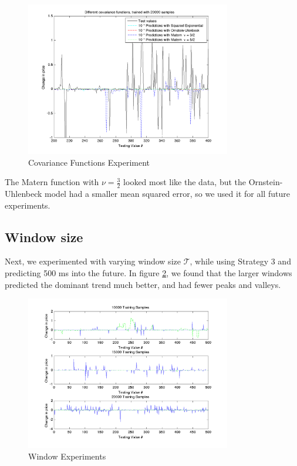 \documentclass{article} %
\begin{document}
\begin{figure}[h]
	\label{fig1}
	\centering
	\includegraphics[width=0.8\textwidth]{../code/fig_1.png}
	\caption{Covariance Functions Experiment}
\end{figure}

The Matern function with $\nu = \frac{3}{2}$ looked most like the data, but the Ornstein-Uhlenbeck model had a smaller mean squared error, so we used it for all future experiments.

\subsection{Window size}
Next, we experimented with varying window size $\mathcal{T}$, while using Strategy 3 and predicting 500 ms into the future.
In figure \ref{fig2}, we found that the larger windows predicted the dominant trend much better, and had fewer peaks and valleys.

\begin{figure}[h]
	\label{fig2}
	\centering
	\includegraphics[width=0.8\textwidth]{../code/fig_2.png}
	\caption{Window Experiments}
\end{figure}
\end{document}
